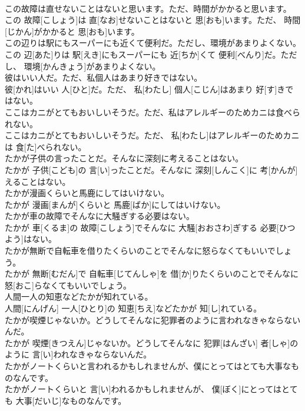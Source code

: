 \documentclass[8pt]{extreport}
\begin{document}
\begin{CJK}{UTF8}{min}
\\	この故障は直せないことはないと思います。ただ、時間がかかると思います。	
\\	この 故障[こしょう]は 直[なお]せないことはないと 思[おも]います。ただ、 時間[じかん]がかかると 思[おも]います。
\\	この辺りは駅にもスーパーにも近くて便利だ。ただし、環境があまりよくない。	
\\	この 辺[あた]りは 駅[えき]にもスーパーにも 近[ちか]くて 便利[べんり]だ。ただし、 環境[かんきょう]があまりよくない。
\\	彼はいい人だ。ただ、私個人はあまり好きではない。	
\\	彼[かれ]はいい 人[ひと]だ。ただ、 私[わたし] 個人[こじん]はあまり 好[す]きではない。
\\	ここはカニがとてもおいしいそうだ。ただ、私はアレルギーのためカニは食べられない。	
\\	ここはカニがとてもおいしいそうだ。ただ、 私[わたし]はアレルギーのためカニは 食[た]べられない。
\\	たかが子供の言ったことだ。そんなに深刻に考えることはない。	
\\	たかが 子供[こども]の 言[い]ったことだ。そんなに 深刻[しんこく]に 考[かんが]えることはない。
\\	たかが漫画くらいと馬鹿にしてはいけない。	
\\	たかが 漫画[まんが]くらいと 馬鹿[ばか]にしてはいけない。
\\	たかが車の故障でそんなに大騒ぎする必要はない。	
\\	たかが 車[くるま]の 故障[こしょう]でそんなに 大騒[おおさわ]ぎする 必要[ひつよう]はない。
\\	たかが無断で自転車を借りたくらいのことでそんなに怒らなくてもいいでしょう。	
\\	たかが 無断[むだん]で 自転車[じてんしゃ]を 借[か]りたくらいのことでそんなに 怒[おこ]らなくてもいいでしょう。
\\	人間一人の知恵などたかが知れている。	
\\	人間[にんげん] 一人[ひとり]の 知恵[ちえ]などたかが 知[し]れている。
\\	たかが喫煙じゃないか。どうしてそんなに犯罪者のように言われなきゃならないんだ。	
\\	たかが 喫煙[きつえん]じゃないか。どうしてそんなに 犯罪[はんざい] 者[しゃ]のように 言[い]われなきゃならないんだ。
\\	たかがノートくらいと言われるかもしれませんが、僕にとってはとても大事なものなんです。	
\\	たかがノートくらいと 言[い]われるかもしれませんが、 僕[ぼく]にとってはとても 大事[だいじ]なものなんです。

\end{CJK}
\end{document}
